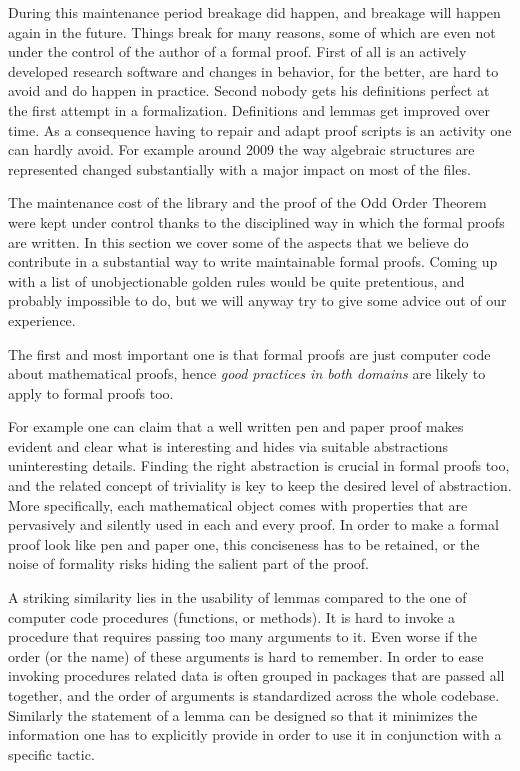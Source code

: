 During this maintenance period breakage did happen, and breakage will happen
again in the future. Things break for many reasons, some of which are even not
under the control of the author of a formal proof. First of all  \Coq{} is an
actively developed research software and changes in behavior, for the better,
are hard to avoid and do happen in practice. Second nobody gets his definitions
perfect at the first attempt in a formalization. Definitions and lemmas get
improved over time.  As a consequence having to repair and adapt proof scripts
is an activity one can hardly avoid.  For example around 2009 the way algebraic
structures are represented changed substantially with a major impact on most
of the files.

The maintenance cost of the  \mcbMC{} library and the proof of the
Odd Order Theorem were kept under control thanks to the disciplined
way in which the formal proofs are written.
In this section we cover some of the aspects that we believe do
contribute in a substantial way to write maintainable formal proofs.
Coming up with a list of unobjectionable golden rules would be quite pretentious,
and probably impossible to do, but we will anyway try to give some
advice out of our experience.

The first and most important one is that formal proofs are just computer code
about mathematical proofs, hence \emph{good practices in both domains}
are likely to apply to formal proofs too.

For example one can claim that a well written pen and paper proof makes evident
and clear what is interesting and hides via suitable abstractions uninteresting
details. Finding the right abstraction is crucial in formal proofs too, and the
related concept of triviality is key to keep the desired level of abstraction.
More specifically, each mathematical object comes with properties that are
pervasively and silently used in each and every proof. In order to make a
formal proof look like pen and paper one, this conciseness has to be retained,
or the noise of formality risks hiding the salient part of the proof.

A striking similarity lies in the usability of lemmas
compared to the one of computer code procedures (functions, or methods).
It is hard to invoke a procedure that requires
passing too many arguments to it. Even worse if the order (or the name)
of these arguments is hard to remember.
In order to ease invoking procedures related data is often
grouped in packages that are passed all together,
and the order of arguments is standardized across the whole codebase.
Similarly the statement of a lemma can be designed so that it
minimizes the information one has to explicitly provide
in order to use it in conjunction with a specific tactic.

